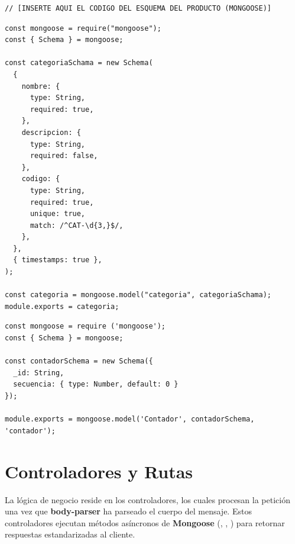 \begin{lstlisting}[caption={Modelo de Mongoose para la colección de Productos (models/Producto.js)}]
// [INSERTE AQUI EL CODIGO DEL ESQUEMA DEL PRODUCTO (MONGOOSE)]
\end{lstlisting}

\begin{lstlisting}[caption={Modelo de Mongoose para la colección de Categoria (models/Categoria.js)}]
const mongoose = require("mongoose");
const { Schema } = mongoose;

const categoriaSchama = new Schema(
  {
    nombre: {
      type: String,
      required: true,
    },
    descripcion: {
      type: String,
      required: false,
    },
    codigo: {
      type: String,
      required: true,
      unique: true,
      match: /^CAT-\d{3,}$/,
    },
  },
  { timestamps: true },
);

const categoria = mongoose.model("categoria", categoriaSchama);
module.exports = categoria;
\end{lstlisting}
\begin{lstlisting}[caption={Modelo de Mongoose para la colección de Contador (models/Contador.js)}]
const mongoose = require ('mongoose');
const { Schema } = mongoose;

const contadorSchema = new Schema({
  _id: String,
  secuencia: { type: Number, default: 0 }
});

module.exports = mongoose.model('Contador', contadorSchema, 'contador');
\end{lstlisting}

\section{Controladores y Rutas}
La lógica de negocio reside en los controladores, los cuales procesan la petición una vez que \textbf{body-parser} ha parseado el cuerpo del mensaje. Estos controladores ejecutan métodos asíncronos de \textbf{Mongoose} (, , ) para retornar respuestas estandarizadas al cliente.

